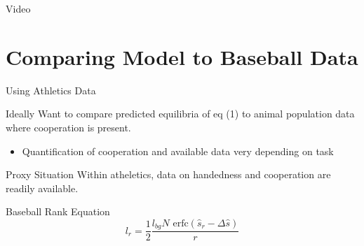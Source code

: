 \documentclass{beamer}
\begin{document}
    \begin{frame}{Video}

    \end{frame}

\section{Comparing Model to Baseball Data}


    \begin{frame}{Using Athletics Data}
      \begin{block}{Ideally}
        Want to compare predicted equilibria of eq (1) to animal population data where cooperation is present.
        \begin{itemize}
            \item Quantification of cooperation and available data very depending on task 
          \end{itemize}  
      \end{block}
      \begin{block}{Proxy Situation}
        Within atheletics, data on handedness and cooperation are readily available.
      \end{block}
      \begin{block}{Baseball Rank Equation}
        \begin{equation}
        l_r = \frac{1}{2}\frac{l_{bg}N\text{ erfc}(\hat{s}_r-\Delta\hat{s})}{r}
      \end{equation}
      \end{block}
      
    \end{frame}
\end{document}
